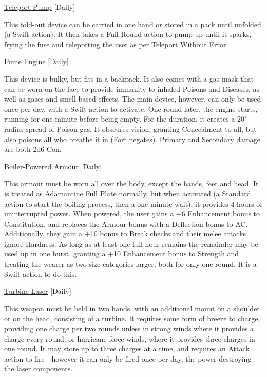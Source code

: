 \medskip\noindent\underline{Teleport-Pump} [Daily] 

\noindent This fold-out device can be carried in one hand or stored in a pack until unfolded (a Swift action). It then takes a Full Round action to pump up until it sparks, frying the fuse and teleporting the user as per Teleport Without Error. 

\medskip\noindent\underline{Fume Engine} [Daily] 

\noindent This device is bulky, but fits in a backpack. It also comes with a gas mask that can be worn on the face to provide immunity to inhaled Poisons and Diseases, as well as gases and smell-based effects. The main device, however, can only be used once per day, with a Swift action to activate. One round later, the engine starts, running for one minute before being empty. For the duration, it creates a 20' radius spread of Poison gas. It obscures vision, granting Concealment to all, but also poisons all who breathe it in (Fort negates). Primary and Secondary damage are both 2d6 Con. 

\medskip\noindent\underline{Boiler-Powered Armour} [Daily]
 
\noindent This armour must be worn all over the body, except the hands, feet and head. It is treated as Adamantine Full Plate normally, but when activated (a Standard action to start the boiling process, then a one minute wait), it provides 4 hours of uninterrupted power. When powered, the user gains a +6 Enhancement bonus to Constitution, and replaces the Armour bonus with a Deflection bonus to AC. Additionally, they gain a +10 bonus to Break checks and their melee attacks ignore Hardness. As long as at least one full hour remains the remainder may be used up in one burst, granting a +10 Enhancement bonus to Strength and treating the wearer as two size categories larger, both for only one round. It is a Swift action to do this. 

\medskip\noindent\underline{Turbine Laser} [Daily] 

\noindent This weapon must be held in two hands, with an additional mount on a shoulder or on the head, consisting of a turbine. It requires some form of breeze to charge, providing one charge per two rounds unless in strong winds where it provides a charge every round, or hurricane force winds, where it provides three charges in one round. It may store up to three charges at a time, and requires an Attack action to fire - however it can only be fired once per day, the power destroying the laser components. 

